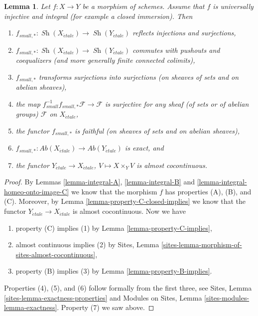 \documentclass[10pt,a4paper]{amsart}
\theoremstyle{plain}
\newtheorem{lemma}[subsection]{Lemma}
\theoremstyle{definition}
\theoremstyle{remark}
\numberwithin{equation}{subsection}
\def\Sh{\mathop{\mathit{Sh}}\nolimits}
\def\etale{{\acute{e}tale}}
\begin{document}
\begin{lemma}
\label{lemma-integral-universally-injective}
Let $f : X \to Y$ be a morphism of schemes. Assume that $f$ is
universally injective and integral (for example a closed immersion).
Then
\begin{enumerate}
\item
$f_{small, *} :
\Sh(X_\etale)
\to
\Sh(Y_\etale)$
reflects injections and surjections,
\item
$f_{small, *} :
\Sh(X_\etale)
\to
\Sh(Y_\etale)$
commutes with pushouts and coequalizers (and more generally
finite connected colimits),
\item $f_{small, *}$ transforms surjections into surjections (on sheaves
of sets and on abelian sheaves),
\item the map
$f_{small}^{-1}f_{small, *}\mathcal{F} \to \mathcal{F}$
is surjective for any sheaf (of sets or of abelian groups)
$\mathcal{F}$ on $X_\etale$,
\item the functor $f_{small, *}$ is faithful (on sheaves of sets and
on abelian sheaves),
\item
$f_{small, *} :
\textit{Ab}(X_\etale)
\to
\textit{Ab}(Y_\etale)$
is exact, and
\item the functor
$Y_\etale \to X_\etale$, $V \mapsto X \times_Y V$ is
almost cocontinuous.
\end{enumerate}
\end{lemma}

\begin{proof}
By
Lemmas \ref{lemma-integral-A},
\ref{lemma-integral-B} and
\ref{lemma-integral-homeo-onto-image-C}
we know that the morphism $f$ has properties (A), (B), and (C).
Moreover, by
Lemma \ref{lemma-property-C-closed-implies}
we know that the functor $Y_\etale \to X_\etale$ is
almost cocontinuous. Now we have
\begin{enumerate}
\item property (C) implies (1) by
Lemma \ref{lemma-property-C-implies},
\item almost continuous implies (2) by
Sites, Lemma \ref{sites-lemma-morphism-of-sites-almost-cocontinuous},
\item property (B) implies (3) by
Lemma \ref{lemma-property-B-implies}.
\end{enumerate}
Properties (4), (5), and (6) follow formally from the first three, see
Sites, Lemma \ref{sites-lemma-exactness-properties}
and
Modules on Sites, Lemma \ref{sites-modules-lemma-exactness}.
Property (7) we saw above.
\end{proof}
\end{document}
